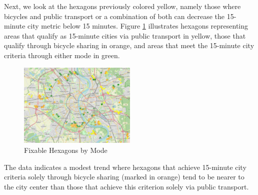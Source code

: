 Next, we look at the hexagons previously colored yellow, namely those where bicycles and public transport or a combination of both can decrease the 15-minute city metric below 15 minutes.
Figure \ref{fig:fixable_hexagons} illustrates hexagons representing areas that qualify as 15-minute cities via public transport in yellow, those that qualify through bicycle sharing in orange, and areas that meet the 15-minute city criteria through either mode in green.
\begin{figure}
  \begin{center}
    \includegraphics[width=0.50\textwidth]{Figures/results/problematic_hexagons/fixable_hexagons}
  \end{center}
  \caption{Fixable Hexagons by Mode}
  \label{fig:fixable_hexagons}
\end{figure}
The data indicates a modest trend where hexagons that achieve 15-minute city criteria solely through bicycle sharing (marked in orange) tend to be nearer to the city center than those that achieve this criterion solely via public transport.


